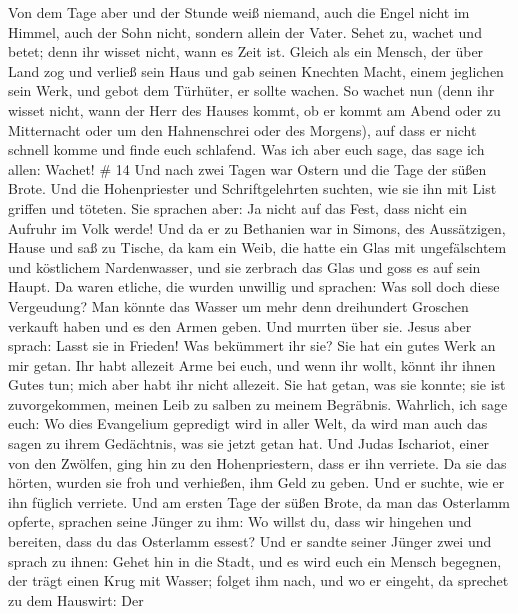 Von dem Tage aber und der Stunde weiß niemand, auch die Engel nicht im
Himmel, auch der Sohn nicht, sondern allein der Vater. 
Sehet zu, wachet und betet; denn ihr wisset nicht, wann es Zeit ist.
 Gleich als ein Mensch, der über Land zog und verließ sein
Haus und gab seinen Knechten Macht, einem jeglichen sein Werk, und gebot
dem Türhüter, er sollte wachen.  So wachet nun (denn ihr
wisset nicht, wann der Herr des Hauses kommt, ob er kommt am Abend oder
zu Mitternacht oder um den Hahnenschrei oder des Morgens), 
auf dass er nicht schnell komme und finde euch schlafend. 
Was ich aber euch sage, das sage ich allen: Wachet! \# 14 
Und nach zwei Tagen war Ostern und die Tage der süßen Brote. Und die
Hohenpriester und Schriftgelehrten suchten, wie sie ihn mit List griffen
und töteten.  Sie sprachen aber: Ja nicht auf das Fest, dass
nicht ein Aufruhr im Volk werde!  Und da er zu Bethanien war
in Simons, des Aussätzigen, Hause und saß zu Tische, da kam ein Weib,
die hatte ein Glas mit ungefälschtem und köstlichem Nardenwasser, und
sie zerbrach das Glas und goss es auf sein Haupt.  Da waren
etliche, die wurden unwillig und sprachen: Was soll doch diese
Vergeudung?  Man könnte das Wasser um mehr denn dreihundert
Groschen verkauft haben und es den Armen geben. Und murrten über sie.
 Jesus aber sprach: Lasst sie in Frieden! Was bekümmert ihr
sie? Sie hat ein gutes Werk an mir getan.  Ihr habt allezeit
Arme bei euch, und wenn ihr wollt, könnt ihr ihnen Gutes tun; mich aber
habt ihr nicht allezeit.  Sie hat getan, was sie konnte; sie
ist zuvorgekommen, meinen Leib zu salben zu meinem Begräbnis.
 Wahrlich, ich sage euch: Wo dies Evangelium gepredigt wird
in aller Welt, da wird man auch das sagen zu ihrem Gedächtnis, was sie
jetzt getan hat.  Und Judas Ischariot, einer von den
Zwölfen, ging hin zu den Hohenpriestern, dass er ihn verriete.
 Da sie das hörten, wurden sie froh und verhießen, ihm Geld
zu geben. Und er suchte, wie er ihn füglich verriete.  Und
am ersten Tage der süßen Brote, da man das Osterlamm opferte, sprachen
seine Jünger zu ihm: Wo willst du, dass wir hingehen und bereiten, dass
du das Osterlamm essest?  Und er sandte seiner Jünger zwei
und sprach zu ihnen: Gehet hin in die Stadt, und es wird euch ein Mensch
begegnen, der trägt einen Krug mit Wasser; folget ihm nach,
 und wo er eingeht, da sprechet zu dem Hauswirt: Der
